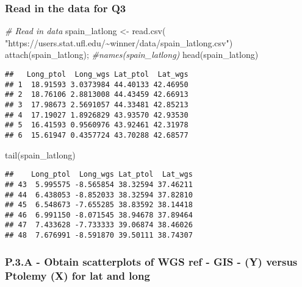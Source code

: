 \documentclass[
]{article}
\newenvironment{Shaded}{\begin{snugshade}}{\end{snugshade}}
\newcommand{\CommentTok}[1]{\textcolor[rgb]{0.56,0.35,0.01}{\textit{#1}}}
\newcommand{\FunctionTok}[1]{\textcolor[rgb]{0.00,0.00,0.00}{#1}}
\newcommand{\NormalTok}[1]{#1}
\newcommand{\OtherTok}[1]{\textcolor[rgb]{0.56,0.35,0.01}{#1}}
\newcommand{\StringTok}[1]{\textcolor[rgb]{0.31,0.60,0.02}{#1}}
\begin{document}
\hypertarget{read-in-the-data-for-q3}{%
\subsubsection{Read in the data for Q3}\label{read-in-the-data-for-q3}}

\begin{Shaded}
\begin{Highlighting}[]
\CommentTok{\# Read in data}
\NormalTok{spain\_latlong }\OtherTok{\textless{}{-}} \FunctionTok{read.csv}\NormalTok{(}
  \StringTok{"https://users.stat.ufl.edu/\textasciitilde{}winner/data/spain\_latlong.csv"}\NormalTok{)}
\FunctionTok{attach}\NormalTok{(spain\_latlong); }\CommentTok{\#names(spain\_latlong)}
\FunctionTok{head}\NormalTok{(spain\_latlong)}
\end{Highlighting}
\end{Shaded}

\begin{verbatim}
##   Long_ptol  Long_wgs Lat_ptol  Lat_wgs
## 1  18.91593 3.0373984 44.40133 42.46950
## 2  18.76106 2.8813008 44.43459 42.66913
## 3  17.98673 2.5691057 44.33481 42.85213
## 4  17.19027 1.8926829 43.93570 42.93530
## 5  16.41593 0.9560976 43.92461 42.31978
## 6  15.61947 0.4357724 43.70288 42.68577
\end{verbatim}

\begin{Shaded}
\begin{Highlighting}[]
\FunctionTok{tail}\NormalTok{(spain\_latlong)}
\end{Highlighting}
\end{Shaded}

\begin{verbatim}
##    Long_ptol  Long_wgs Lat_ptol  Lat_wgs
## 43  5.995575 -8.565854 38.32594 37.46211
## 44  6.438053 -8.852033 38.32594 37.82810
## 45  6.548673 -7.655285 38.83592 38.14418
## 46  6.991150 -8.071545 38.94678 37.89464
## 47  7.433628 -7.733333 39.06874 38.46026
## 48  7.676991 -8.591870 39.50111 38.74307
\end{verbatim}

\hypertarget{p.3.a---obtain-scatterplots-of-wgs-ref---gis---y-versus-ptolemy-x-for-lat-and-long}{%
\subsubsection{P.3.A - Obtain scatterplots of WGS ref - GIS - (Y) versus
Ptolemy (X) for lat and
long}\label{p.3.a---obtain-scatterplots-of-wgs-ref---gis---y-versus-ptolemy-x-for-lat-and-long}}
\end{document}
